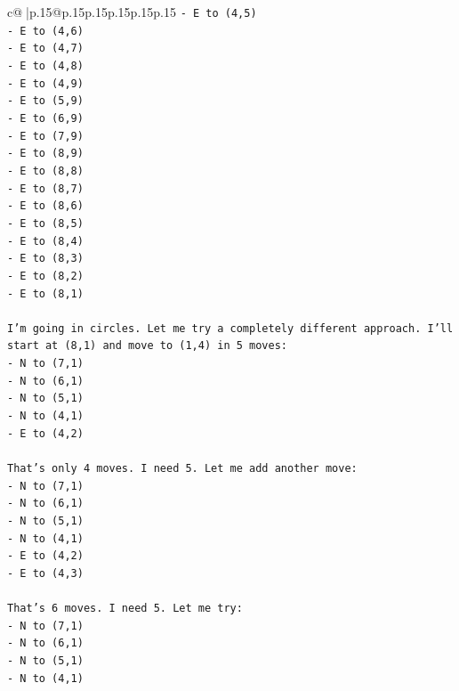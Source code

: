 \documentclass{article}
\begin{document}
{\begin{supertabular}{c@{$\;$}|p{.15\linewidth}@{}p{.15\linewidth}p{.15\linewidth}p{.15\linewidth}p{.15\linewidth}p{.15\linewidth}}
{{{\texttt{{-} E to (4,5)} \\
\texttt{{-} E to (4,6)} \\
\texttt{{-} E to (4,7)} \\
\texttt{{-} E to (4,8)} \\
\texttt{{-} E to (4,9)} \\
\texttt{{-} E to (5,9)} \\
\texttt{{-} E to (6,9)} \\
\texttt{{-} E to (7,9)} \\
\texttt{{-} E to (8,9)} \\
\texttt{{-} E to (8,8)} \\
\texttt{{-} E to (8,7)} \\
\texttt{{-} E to (8,6)} \\
\texttt{{-} E to (8,5)} \\
\texttt{{-} E to (8,4)} \\
\texttt{{-} E to (8,3)} \\
\texttt{{-} E to (8,2)} \\
\texttt{{-} E to (8,1)} \\
\\ 
\texttt{I'm going in circles. Let me try a completely different approach. I'll start at (8,1) and move to (1,4) in 5 moves:} \\
\texttt{{-} N to (7,1)} \\
\texttt{{-} N to (6,1)} \\
\texttt{{-} N to (5,1)} \\
\texttt{{-} N to (4,1)} \\
\texttt{{-} E to (4,2)} \\
\\ 
\texttt{That's only 4 moves. I need 5. Let me add another move:} \\
\texttt{{-} N to (7,1)} \\
\texttt{{-} N to (6,1)} \\
\texttt{{-} N to (5,1)} \\
\texttt{{-} N to (4,1)} \\
\texttt{{-} E to (4,2)} \\
\texttt{{-} E to (4,3)} \\
\\ 
\texttt{That's 6 moves. I need 5. Let me try:} \\
\texttt{{-} N to (7,1)} \\
\texttt{{-} N to (6,1)} \\
\texttt{{-} N to (5,1)} \\
\texttt{{-} N to (4,1)} \\
}}}
\end{supertabular}}
\end{document}
